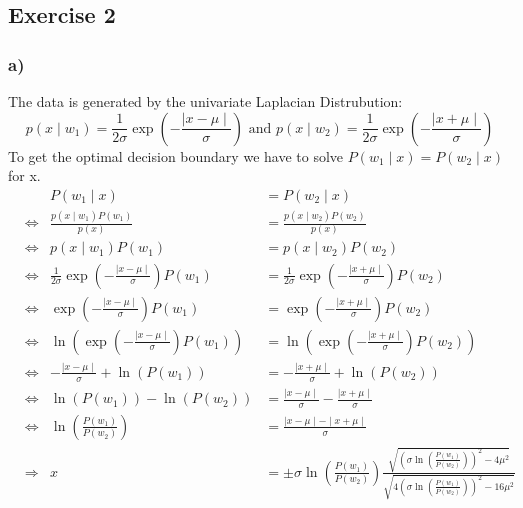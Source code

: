 \documentclass[10pt,a4paper]{article}
\begin{document}
\subsection*{Exercise 2}
\subsubsection*{a)}
The data is generated by the univariate Laplacian Distrubution:
$$p(x\mid w_1) = \frac{1}{2\sigma}\exp\left(-\frac{\mid x - \mu \mid}{\sigma}\right) \textrm{ and } p(x\mid w_2) = \frac{1}{2\sigma}\exp\left(-\frac{\mid x + \mu \mid}{\sigma}\right)$$
To get the optimal decision boundary we have to solve $P(w_1\mid x) = P(w_2 \mid x)$ for x.
\begin{align*}
&& P(w_1 \mid x) &= P(w_2 \mid x) \\
&\Leftrightarrow &\frac{p(x \mid w_1)P(w_1)}{p(x)} &= \frac{p(x \mid w_2)P(w_2)}{p(x)} \\
&\Leftrightarrow &p(x\mid w_1)P(w_1) &= p(x \mid w_2)P(w_2) \\
&\Leftrightarrow &\frac{1}{2\sigma}\exp\left(-\frac{\mid x - \mu \mid}{\sigma}\right)P(w_1) &= \frac{1}{2\sigma}\exp\left(-\frac{\mid x + \mu \mid}{\sigma}\right)P(w_2) \\
&\Leftrightarrow &\exp\left(-\frac{\mid x - \mu \mid}{\sigma}\right)P(w_1) &= \exp\left(-\frac{\mid x + \mu \mid}{\sigma}\right)P(w_2) \\
&\Leftrightarrow &\ln(\exp\left(-\frac{\mid x - \mu \mid}{\sigma}\right)P(w_1)) &= \ln(\exp\left(-\frac{\mid x + \mu \mid}{\sigma}\right)P(w_2)) \\
&\Leftrightarrow &-\frac{\mid x - \mu \mid}{\sigma} + \ln(P(w_1)) &= -\frac{\mid x + \mu \mid}{\sigma} + \ln(P(w_2)) \\
&\Leftrightarrow & \ln(P(w_1)) - \ln(P(w_2)) &= \frac{\mid x - \mu \mid}{\sigma} - \frac{\mid x + \mu \mid}{\sigma} \\
&\Leftrightarrow & \ln\left(\frac{P(w_1)}{P(w_2)}\right) &= \frac{\mid x - \mu \mid - \mid x + \mu \mid}{\sigma} \\
&\Rightarrow & x &= \pm \sigma\ln\left(\frac{P(w_1)}{P(w_2)}\right)\frac{\sqrt{\left(\sigma\ln\left(\frac{P(w_1)}{P(w_2)}\right)\right)^2 - 4\mu^2}}{\sqrt{4\left(\sigma\ln\left(\frac{P(w_1)}{P(w_2)}\right)\right)^2 - 16\mu^2}}
\end{align*}
\end{document}
